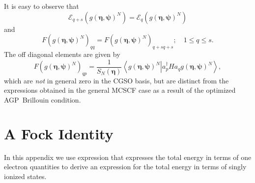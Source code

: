 \documentclass[aps,preprint]{revtex4}%
\begin{document}
It is easy to observe that
\begin{equation}
\mathcal{E}_{q+s}\left(  g\left(  \bm{\eta},\bm{\psi}\right)  ^{N}\right)
=\mathcal{E}_{q}\left(  g\left(  \bm{\eta},\bm{\psi }\right)  ^{N}\right)
\end{equation}
and
\begin{equation}
F\left(  g\left(  \bm{\eta},\bm{\psi}\right)  ^{N}\right)  _{qq}=F\left(
g\left(  \bm{\eta},\bm{\psi}\right)  ^{N}\right)  _{q+sq+s};\quad1\leq q\leq
s.
\end{equation}
The off diagonal elements are given by
\begin{equation}
F\left(  g\left(  \bm{\eta},\bm{\psi}\right)  ^{N}\right)  _{qp}=\frac
{1}{S_{N}\left(  \bm{\eta}\right)  }\left\langle \left.  g\left(
\bm{\eta},\bm{\psi}\right)  ^{N}\right\vert a_{p}^{\dagger}Ha_{q}g\left(
\bm{\eta},\bm{\psi}\right)  ^{N}\right\rangle ,
\end{equation}
which are \emph{not }in general zero in the CGSO basis, but are distinct from
the expressions obtained in the general MCSCF case as a result of the
optimized AGP\ Brillouin condition.

\section{A Fock Identity\label{FockID}}

In this appendix we use expression that expresses the total energy in terms of
one electron quantities to derive an expression for the total energy in terms
of singly ionized states.
\end{document}
